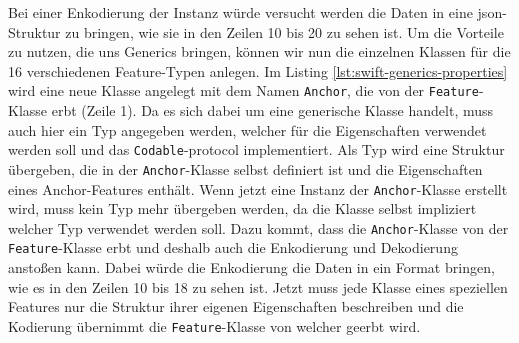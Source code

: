 Bei einer Enkodierung der Instanz würde versucht werden die Daten in eine \ac{json}-Struktur zu bringen, wie sie in den Zeilen 10 bis 20 zu sehen ist.
Um die Vorteile zu nutzen, die uns Generics bringen, können wir nun die einzelnen Klassen für die 16 verschiedenen Feature-Typen anlegen.
Im Listing \ref{lst:swift-generics-properties} wird eine neue Klasse angelegt mit dem Namen \texttt{Anchor}, die von der \texttt{Feature}-Klasse erbt (Zeile 1).
Da es sich dabei um eine generische Klasse handelt, muss auch hier ein Typ angegeben werden, welcher für die Eigenschaften verwendet werden soll und das \texttt{Codable}-\Gls{protocol} implementiert.
Als Typ wird eine Struktur übergeben, die in der \texttt{Anchor}-Klasse selbst definiert ist und die Eigenschaften eines Anchor-Features enthält.
Wenn jetzt eine Instanz der \texttt{Anchor}-Klasse erstellt wird, muss kein Typ mehr übergeben werden, da die Klasse selbst impliziert welcher Typ verwendet werden soll.
Dazu kommt, dass die \texttt{Anchor}-Klasse von der \texttt{Feature}-Klasse erbt und deshalb auch die Enkodierung und Dekodierung anstoßen kann.
Dabei würde die Enkodierung die Daten in ein Format bringen, wie es in den Zeilen 10 bis 18 zu sehen ist.\pbreak%
%
Jetzt muss jede Klasse eines speziellen Features nur die Struktur ihrer eigenen Eigenschaften beschreiben und die Kodierung übernimmt die \texttt{Feature}-Klasse von welcher geerbt wird.

